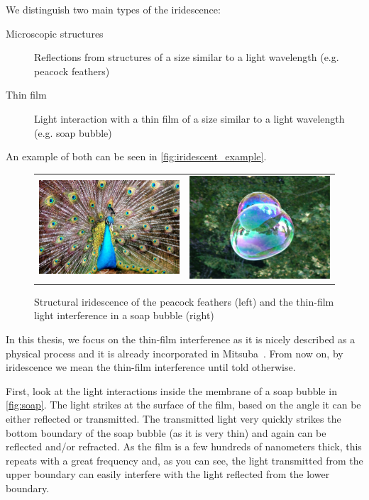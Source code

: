 We distinguish two main types of the iridescence:

\begin{description}
	\item[Microscopic structures] Reflections from structures of a size similar to a light wavelength (e.g. peacock feathers)
	\item[Thin film] Light interaction with a thin film of a size similar to a light wavelength (e.g. soap bubble)
\end{description}

An example of both can be seen in \autoref{fig:iridescent_example}.

\begin{figure}
	\centering
	\begin{tabular}{cc}
		\includegraphics[width=0.4\linewidth]{img/iridescent_peacock.jpg}
		&
		\includegraphics[width=0.4\linewidth]{img/iridescent_soap.jpg}
	\end{tabular}
	\caption[Irid example]{Structural iridescence of the peacock feathers (left) and the thin-film light interference in a soap bubble (right)\footnotemark}
	\label{fig:iridescent_example}
\end{figure}

In this thesis, we focus on the thin-film interference as it is nicely described as a physical process and it is already incorporated in Mitsuba~\cite{belcour2017practical}. From now on, by iridescence we mean the thin-film interference until told otherwise.

First, look at the light interactions inside the membrane of a soap bubble in \autoref{fig:soap}. The light strikes at the surface of the film, based on the angle it can be either reflected or transmitted. The transmitted light very quickly strikes the bottom boundary of the soap bubble (as it is very thin) and again can be reflected and/or refracted. As the film is a few hundreds of nanometers thick, this repeats with a great frequency and, as you can see, the light transmitted from the upper boundary can easily interfere with the light reflected from the lower boundary.

